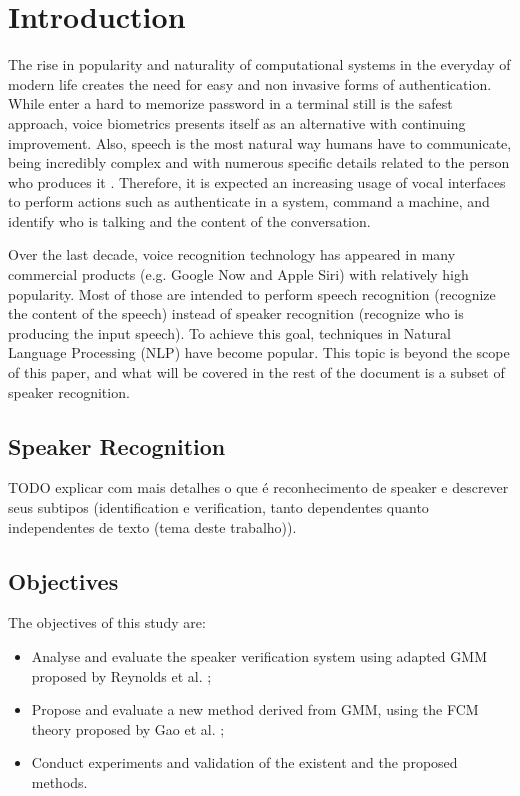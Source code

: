 \chapter{Introduction}

The rise in popularity and naturality of computational systems in the everyday of modern life creates the need for easy and non invasive forms of authentication. While enter a hard to memorize password in a terminal still is the safest approach, voice biometrics presents itself as an alternative with continuing improvement. Also, speech is the most natural way humans have to communicate, being incredibly complex and with numerous specific details related to the person who produces it \autocite{bimbot.et.al.2004}. Therefore, it is expected an increasing usage of vocal interfaces to perform actions such as authenticate in a system, command a machine, and identify who is talking and the content of the conversation.

Over the last decade, voice recognition technology has appeared in many commercial products (e.g. Google Now and Apple Siri) with relatively high popularity. Most of those are intended to perform speech recognition (recognize the content of the speech) instead of speaker recognition (recognize who is producing the input speech). To achieve this goal, techniques in Natural Language Processing (NLP) have become popular. This topic is beyond the scope of this paper, and what will be covered in the rest of the document is a subset of speaker recognition.

\section{Speaker Recognition}

TODO explicar com mais detalhes o que é reconhecimento de speaker e descrever seus subtipos (identification e verification, tanto dependentes quanto independentes de texto (tema deste trabalho)).

\section{Objectives}

The objectives of this study are:

\begin{itemize}\itemsep0pt
    \item Analyse and evaluate the speaker verification system using adapted GMM proposed by Reynolds et al. \autocite{reynolds.quatieri.dunn.2000};
    \item Propose and evaluate a new method derived from GMM, using the FCM theory proposed by Gao et al. \autocite{gao.zhou.pu.2013};
    \item Conduct experiments and validation of the existent and the proposed methods.
\end{itemize}

